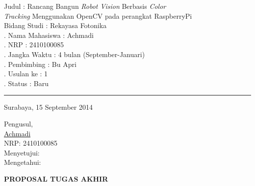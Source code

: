 \documentclass[a4paper,12pt]{article}
\begin{document}
\begin{flushleft}
  \noindent Judul \hspace{80pt} : Rancang Bangun \textit{Robot Vision} Berbasis \textit{Color} \\[5pt]
  \textit{Tracking} Menggunakan OpenCV pada perangkat RaspberryPi \\[5pt]
  \noindent Bidang Studi \hspace{42pt} : Rekayasa Fotonika\\[5pt]
  . Nama Mahasiswa \hspace{5pt} : Achmadi\\[5pt]
  . NRP  \hspace{70pt} : 2410100085\\[5pt]
  . Jangka Waktu \hspace{20pt} : 4 bulan (September-Januari)\\[5pt]
  . Pembimbing \hspace{28pt} : Bu Apri\\[5pt]
  . Usulan ke \hspace{40pt} : 1\\[5pt]
  . Status \hspace{60pt} : Baru\\[5pt]
\end{flushleft}
\rule{385pt}{5pt}
\begin{flushright}
  Surabaya, 15 September 2014
\end{flushright}
\begin{center}
 Pengusul,
 \\[40pt]
 \underline{Achmadi}\\
 NRP: 2410100085
 \\[40pt]
 Menyetujui:
 \\[100pt]
 Mengetahui:\\
\end{center}
\newpage
\begin{center}
 \textbf{PROPOSAL TUGAS AKHIR}
\end{center}
\end{document}
